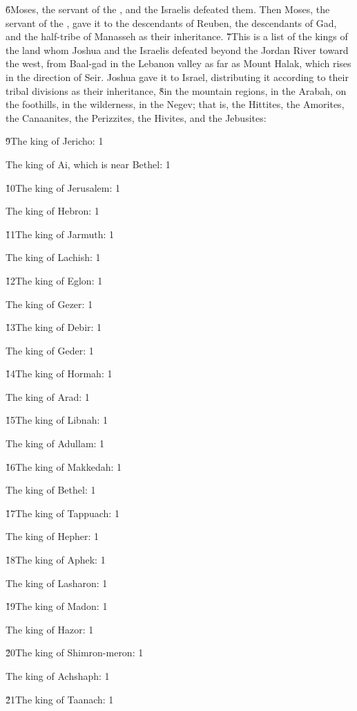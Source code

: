 \v{6}Moses, the servant of the , and the Israelis defeated them. Then Moses, the servant of the , gave it to the descendants of Reuben, the descendants of Gad, and the half-tribe of Manasseh as their inheritance. \v{7}This is a list of the kings of the land whom Joshua and the Israelis defeated beyond the Jordan River toward the west, from Baal-gad in the Lebanon valley as far as Mount Halak, which rises in the direction of Seir. Joshua gave it to Israel, distributing it according to their tribal divisions as their inheritance, \v{8}in the mountain regions, in the Arabah, on the foothills, in the wilderness, in the Negev; that is, the Hittites, the Amorites, the Canaanites, the Perizzites, the Hivites, and the Jebusites:

\v{9}The king of Jericho: 1

The king of Ai, which is near Bethel: 1

\v{10}The king of Jerusalem: 1

The king of Hebron: 1

\v{11}The king of Jarmuth: 1

The king of Lachish: 1

\v{12}The king of Eglon: 1

The king of Gezer: 1

\v{13}The king of Debir: 1

The king of Geder: 1

\v{14}The king of Hormah: 1

The king of Arad: 1

\v{15}The king of Libnah: 1

The king of Adullam: 1

\v{16}The king of Makkedah: 1

The king of Bethel: 1

\v{17}The king of Tappuach: 1

The king of Hepher: 1

\v{18}The king of Aphek: 1

The king of Lasharon: 1

\v{19}The king of Madon: 1

The king of Hazor: 1

\v{20}The king of Shimron-meron: 1

The king of Achshaph: 1

\v{21}The king of Taanach: 1

